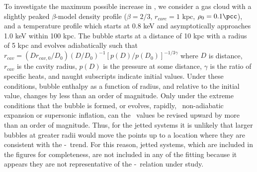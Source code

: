 \documentclass{emulateapj}
\begin{document}
To investigate the maximum possible increase in \pcav, we consider a
gas cloud with a slightly peaked $\beta$-model density profile ($\beta
= 2/3$, $r_{core} = 1$ kpc, $\rho_0 = 0.1 \pcc$), and a temperature
profile which starts at 0.8 keV and asymptotically approaches 1.0 keV
within 100 kpc. The bubble starts at a distance of 10 kpc with a
radius of 5 kpc and evolves adiabatically such that $r_{cav} = (D
r_{cav,0}/D_0) (D/D_0)^{-1} [p(D)/p(D_0)]^{-1/3\gamma}$
\citep{mcnamrev} where $D$ is distance, $r_{cav}$ is the cavity
radius, $p(D)$ is the pressure at some distance, $\gamma$ is the ratio
of specific heats, and naught subscripts indicate initial
values. Under these conditions, bubble enthalpy as a function of
radius, and relative to the initial value, changes by less than an
order of magnitude. Only under the extreme conditions that the bubble
is formed, or evolves, rapidly, \eg\ non-adiabatic expansion or
supersonic inflation, can the \pcav\ values be revised upward by more
than an order of magnitude. Thus, for the jetted systems it is
unlikely that larger bubbles at greater radii would move the points up
to a location where they are consistent with the \pcav-\prad\
trend. For this reason, jetted systems, which are included in the
figures for completeness, are not included in any of the fitting
because it appears they are not representative of the \pjet-\prad\
relation under study.


\end{document}

